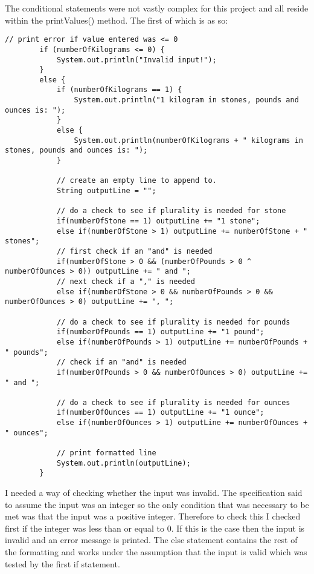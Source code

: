 \documentclass[a4paper]{article}
\begin{document}
The conditional statements were not vastly complex for this project and all reside within the printValues() method. The first of which is as so:
\begin{lstlisting}
// print error if value entered was <= 0
        if (numberOfKilograms <= 0) {
            System.out.println("Invalid input!");
        }
        else {
            if (numberOfKilograms == 1) {
                System.out.println("1 kilogram in stones, pounds and ounces is: ");
            }
            else {
                System.out.println(numberOfKilograms + " kilograms in stones, pounds and ounces is: ");
            }

            // create an empty line to append to.
            String outputLine = "";

            // do a check to see if plurality is needed for stone
            if(numberOfStone == 1) outputLine += "1 stone";
            else if(numberOfStone > 1) outputLine += numberOfStone + " stones";
            // first check if an "and" is needed
            if(numberOfStone > 0 && (numberOfPounds > 0 ^ numberOfOunces > 0)) outputLine += " and ";
            // next check if a "," is needed
            else if(numberOfStone > 0 && numberOfPounds > 0 && numberOfOunces > 0) outputLine += ", ";

            // do a check to see if plurality is needed for pounds
            if(numberOfPounds == 1) outputLine += "1 pound";
            else if(numberOfPounds > 1) outputLine += numberOfPounds + " pounds";
            // check if an "and" is needed
            if(numberOfPounds > 0 && numberOfOunces > 0) outputLine += " and ";

            // do a check to see if plurality is needed for ounces
            if(numberOfOunces == 1) outputLine += "1 ounce";
            else if(numberOfOunces > 1) outputLine += numberOfOunces + " ounces";

            // print formatted line
            System.out.println(outputLine);
        }
\end{lstlisting}
I needed a way of checking whether the input was invalid. The specification said to assume the input was an integer so the only condition that was 
necessary to be met was that the input was a positive integer. Therefore to check this I checked first if the integer was less than or equal to 0. If 
this is the case then the input is invalid and an error message is printed. The else statement contains the rest of the formatting and works under the 
assumption that the input is valid which was tested by the first if statement.
\end{document}
